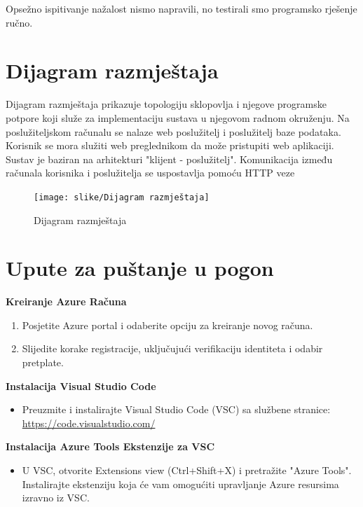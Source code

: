 			Opsežno ispitivanje nažalost nismo napravili, no testirali smo programsko rješenje ručno.
			
			
			\eject 
		
		
		\section{Dijagram razmještaja}
			
			Dijagram razmještaja prikazuje topologiju sklopovlja i njegove programske potpore koji služe za implementaciju sustava u njegovom radnom okruženju. Na poslužiteljskom računalu se nalaze web poslužitelj i poslužitelj baze podataka. Korisnik se mora služiti web preglednikom da može pristupiti web aplikaciji. Sustav je baziran na arhitekturi "klijent - poslužitelj". Komunikacija između računala korisnika i poslužitelja se uspostavlja pomoću HTTP veze
			 \begin{figure}[hbt!]
			 	\centering
			 	\texttt{[image: slike/Dijagram razmještaja]}
			 	\caption{Dijagram razmještaja}
			 	\label{fig:razmjestaj}
			 \end{figure}
			
			\eject 
		
			\section{Upute za puštanje u pogon}
				\label{sec:deployment}

				\textbf{Kreiranje Azure Računa}
				\begin{enumerate}
					\item Posjetite Azure portal i odaberite opciju za kreiranje novog računa.
					\item Slijedite korake registracije, uključujući verifikaciju identiteta i odabir pretplate.
				\end{enumerate}

				\textbf{Instalacija Visual Studio Code}
				\begin{itemize}
					\item Preuzmite i instalirajte Visual Studio Code (VSC) sa službene stranice: \url{https://code.visualstudio.com/}
				\end{itemize}

				\textbf{Instalacija Azure Tools Ekstenzije za VSC}
				\begin{itemize}
					\item U VSC, otvorite Extensions view (Ctrl+Shift+X) i pretražite "Azure Tools". Instalirajte ekstenziju koja će vam omogućiti upravljanje Azure resursima izravno iz VSC.
				\end{itemize}

